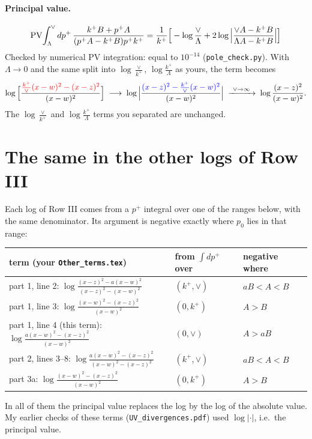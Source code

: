 \documentclass[10pt]{article}
\newcommand{\new}[1]{{\color{blue}#1}}
\newcommand{\old}[1]{{\color{red}#1}}
\begin{document}
\paragraph{Principal value.}
\begin{equation*}
{\rm PV}\!\int_\Lambda^\vee dp^+\,\frac{k^+B+p^+A}{(p^+A-k^+B)p^+k^+}=\frac{1}{k^+}\Big[-\log\frac{\vee}{\Lambda}+2\log\Big|\frac{\vee A-k^+B}{\Lambda A-k^+B}\Big|\Big]
\end{equation*}
Checked by numerical PV integration: equal to $10^{-14}$ (\texttt{pole\_check.py}). With $\Lambda\to0$ and the same split into $\log\frac{\vee}{k^+}$, $\log\frac{k^+}{\Lambda}$ as yours, the term becomes
\begin{equation*}
\log\Big[\frac{\old{\frac{k^{+}}{\vee}(x-w)^{2}-(x-z)^{2}}}{(x-w)^{2}}\Big]\;\longrightarrow\;\log\Big|\frac{\new{(x-z)^{2}-\frac{k^{+}}{\vee}(x-w)^{2}}}{(x-w)^{2}}\Big|\;\xrightarrow{\ \vee\to\infty\ }\;\log\frac{(x-z)^2}{(x-w)^2}.
\end{equation*}
The $\log\frac{\vee}{k^+}$ and $\log\frac{k^+}{\Lambda}$ terms you separated are unchanged.

\section{The same in the other logs of Row III}
Each log of Row III comes from a $p^+$ integral over one of the ranges below, with the same denominator. Its argument is negative exactly where $p_0$ lies in that range:
\begin{center}\small
\begin{tabular}{@{}lll@{}}\toprule
term (your \texttt{Other\_terms.tex}) & from $\int dp^+$ over & negative where\\\midrule
part 1, line 2: $\log\frac{(x-z)^2-a(x-w)^2}{(x-z)^2-(x-w)^2}$ & $(k^+,\vee)$ & $aB<A<B$\\
part 1, line 3: $\log\frac{(x-w)^2-(x-z)^2}{(x-w)^2}$ & $(0,k^+)$ & $A>B$\\
part 1, line 4 (this term): $\log\frac{a(x-w)^2-(x-z)^2}{(x-w)^2}$ & $(0,\vee)$ & $A>aB$\\
part 2, lines 3--8: $\log\frac{a(x-w)^2-(x-z)^2}{(x-w)^2-(x-z)^2}$ & $(k^+,\vee)$ & $aB<A<B$\\
part 3a: $\log\frac{(x-w)^2-(x-z)^2}{(x-w)^2}$ & $(0,k^+)$ & $A>B$\\\bottomrule
\end{tabular}
\end{center}
In all of them the principal value replaces the log by the log of the absolute value. My earlier checks of these terms (\texttt{UV\_divergences.pdf}) used $\log|\cdot|$, i.e.\ the principal value.
\end{document}

